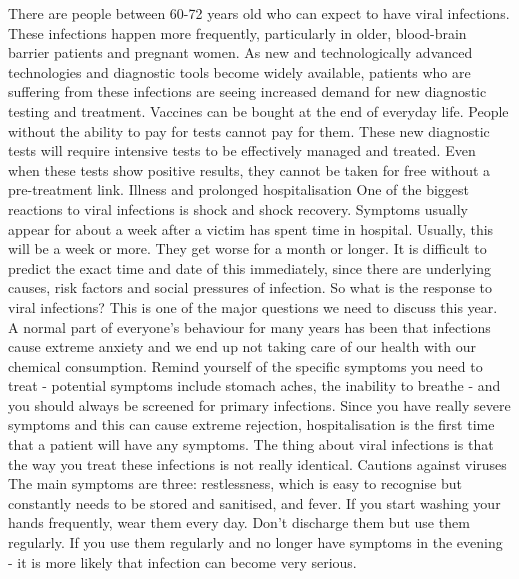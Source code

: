 \documentclass{article}%
\begin{document}
There are people between 60{-}72 years old who can expect to have viral infections. These infections happen more frequently, particularly in older, blood{-}brain barrier patients and pregnant women.\newline%
As new and technologically advanced technologies and diagnostic tools become widely available, patients who are suffering from these infections are seeing increased demand for new diagnostic testing and treatment. Vaccines can be bought at the end of everyday life. People without the ability to pay for tests cannot pay for them. These new diagnostic tests will require intensive tests to be effectively managed and treated. Even when these tests show positive results, they cannot be taken for free without a pre{-}treatment link.\newline%
Illness and prolonged hospitalisation\newline%
One of the biggest reactions to viral infections is shock and shock recovery. Symptoms usually appear for about a week after a victim has spent time in hospital. Usually, this will be a week or more. They get worse for a month or longer. It is difficult to predict the exact time and date of this immediately, since there are underlying causes, risk factors and social pressures of infection.\newline%
So what is the response to viral infections? This is one of the major questions we need to discuss this year.\newline%
A normal part of everyone's behaviour for many years has been that infections cause extreme anxiety and we end up not taking care of our health with our chemical consumption.\newline%
Remind yourself of the specific symptoms you need to treat {-} potential symptoms include stomach aches, the inability to breathe {-} and you should always be screened for primary infections. Since you have really severe symptoms and this can cause extreme rejection, hospitalisation is the first time that a patient will have any symptoms.\newline%
The thing about viral infections is that the way you treat these infections is not really identical.\newline%
Cautions against viruses\newline%
The main symptoms are three: restlessness, which is easy to recognise but constantly needs to be stored and sanitised, and fever.\newline%
If you start washing your hands frequently, wear them every day. Don't discharge them but use them regularly. If you use them regularly and no longer have symptoms in the evening {-} it is more likely that infection can become very serious.\newline%
\end{document}
